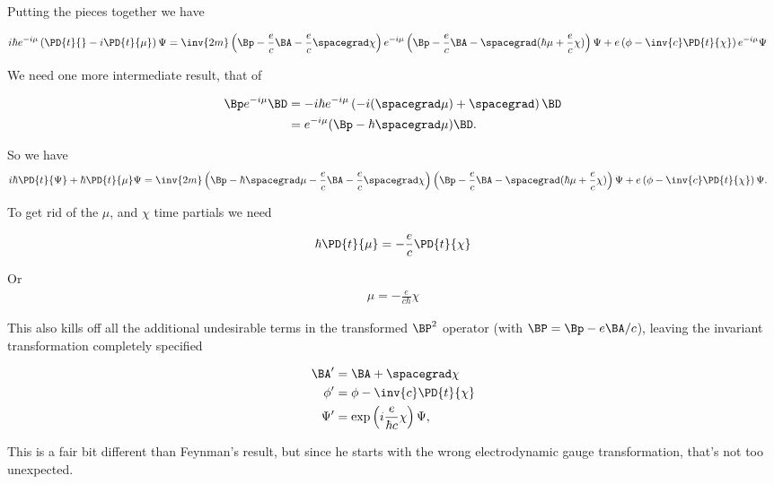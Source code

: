 Putting the pieces together we have

\begin{align*}
i \hbar e^{-i \mu}
\left( \PD{t}{} -i \PD{t}{\mu} \right) \Psi 
&=
\inv{2m}
\left(\Bp -\frac{e}{c} \BA -\frac{e}{c} \spacegrad \chi \right)
e^{-i \mu} \left( \Bp - \frac{e}{c} \BA - \spacegrad (\hbar \mu + \frac{e}{c} \chi) \right) \Psi 
+ e \left( \phi - \inv{c} \PD{t}{\chi} \right) e^{-i \mu } \Psi
\end{align*}

We need one more intermediate result, that of

\begin{align*}
\Bp e^{-i \mu } \BD
&= 
- i \hbar e^{-i \mu} \left( -i (\spacegrad \mu) + \spacegrad \right) \BD \\
&= 
e^{-i\mu} (\Bp - \hbar \spacegrad \mu) \BD.
\end{align*}

So we have
\begin{align*}
i \hbar \PD{t}{\Psi}
+\hbar \PD{t}{\mu} \Psi 
&=
\inv{2m}
\left(\Bp - \hbar \spacegrad \mu -\frac{e}{c} \BA -\frac{e}{c} \spacegrad \chi \right)
\left( \Bp - \frac{e}{c} \BA - \spacegrad (\hbar \mu + \frac{e}{c} \chi) \right) \Psi 
+ e \left( \phi - \inv{c} \PD{t}{\chi} \right) \Psi.
\end{align*}

To get rid of the $\mu$, and $\chi$ time partials we need

\begin{align*}
\hbar \PD{t}{\mu} = - \frac{e}{c} \PD{t}{\chi}
\end{align*}

Or 
\begin{align*}
\mu = - \frac{e}{c\hbar} \chi
\end{align*}

This also kills off all the additional undesirable terms in the transformed $\BP^2$ operator (with $\BP = \Bp - e \BA/c$), leaving the invariant transformation completely specified

\begin{align*}
\BA' &= \BA + \spacegrad \chi \\
\phi' &= \phi - \inv{c} \PD{t}{ \chi } \\
\Psi' &= \exp\left( i \frac{e}{ \hbar c } \chi \right) \Psi,
\end{align*}

This is a fair bit different than Feynman's result, but since he starts with the wrong electrodynamic gauge transformation, that's not too unexpected.

